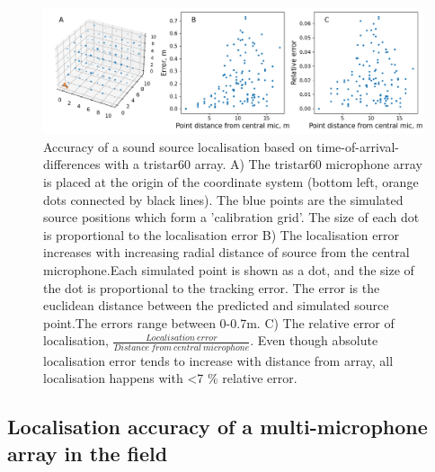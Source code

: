\documentclass[
]{book}
\begin{document}
\begin{figure}
\includegraphics[width=1.0\columnwidth]{original_papers/tacost/data_for_figures/analysis/fig1_points_and_error.png}
\centering
\caption{Accuracy of a sound source localisation based on time-of-arrival-differences with a tristar60 array. A) The tristar60 microphone array is placed at the origin of the coordinate system (bottom left, orange dots connected by black lines). The blue points are the simulated source positions which form a 'calibration grid'. The size of each dot is proportional to the localisation error B) The localisation error increases with increasing radial distance of source from the central microphone.Each simulated point is shown as a dot, and the size of the dot is proportional to the tracking error. The error is the euclidean distance between the predicted and simulated source point.The errors range between 0-0.7m. C) The relative error of localisation, $\frac{Localisation \:error}{Distance \:from \:central \:microphone}$. Even though absolute localisation error tends to increase with distance from array, all localisation happens with <7 $\%$ relative error.}
\label{tacostfig1}
\end{figure}

\hypertarget{localisation-accuracy-of-a-multi-microphone-array-in-the-field}{%
\subsection{Localisation accuracy of a multi-microphone array in the field}\label{localisation-accuracy-of-a-multi-microphone-array-in-the-field}}
\end{document}
